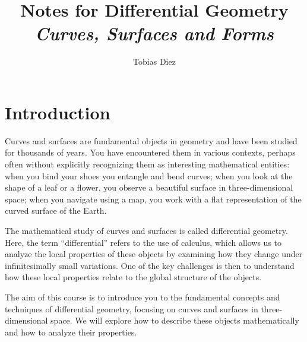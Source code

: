\documentclass[10pt]{article}
\begin{document}
    \title{{Notes for Differential Geometry}
        \\{\normalsize{\itshape Curves, Surfaces and Forms}}}
    \author{Tobias Diez}
    
    \maketitle

    \section*{Introduction}

    Curves and surfaces are fundamental objects in geometry and have been studied for thousands of years. 
    You have encountered them in various contexts, perhaps often without explicitly recognizing them as interesting mathematical entities: when you bind your shoes you entangle and bend curves; when you look at the shape of a leaf or a flower, you observe a beautiful surface in three-dimensional space; when you navigate using a map, you work with a flat representation of the curved surface of the Earth.
    
    The mathematical study of curves and surfaces is called differential geometry.
    Here, the term ``differential'' refers to the use of calculus, which allows us to analyze the local properties of these objects by examining how they change under infinitesimally small variations. One of the key challenges is then to understand how these local properties relate to the global structure of the objects.

    The aim of this course is to introduce you to the fundamental concepts and techniques of differential geometry, focusing on curves and surfaces in three-dimensional space.
    We will explore how to describe these objects mathematically and how to analyze their properties.
\end{document}
